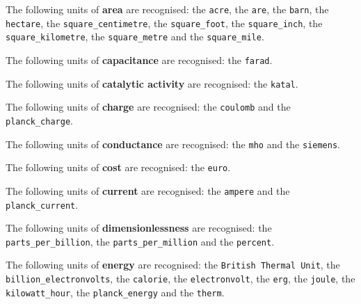\noindent The following units of {\bf area} are recognised:\newline
\noindent the {\tt acre}, the {\tt are}, the {\tt barn}, the {\tt hectare}, the {\tt square\_\-centimetre}, the {\tt square\_\-foot}, the {\tt square\_\-inch}, the {\tt square\_\-kilometre}, the {\tt square\_\-metre} and the {\tt square\_\-mile}.\vspace{5mm}

\noindent The following units of {\bf capacitance} are recognised:\newline
\noindent the {\tt farad}.\vspace{5mm}

\noindent The following units of {\bf catalytic activity} are recognised:\newline
\noindent the {\tt katal}.\vspace{5mm}

\noindent The following units of {\bf charge} are recognised:\newline
\noindent the {\tt coulomb} and the {\tt planck\_\-charge}.\vspace{5mm}

\noindent The following units of {\bf conductance} are recognised:\newline
\noindent the {\tt mho} and the {\tt siemens}.\vspace{5mm}

\noindent The following units of {\bf cost} are recognised:\newline
\noindent the {\tt euro}.\vspace{5mm}

\noindent The following units of {\bf current} are recognised:\newline
\noindent the {\tt ampere} and the {\tt planck\_\-current}.\vspace{5mm}

\noindent The following units of {\bf dimensionlessness} are recognised:\newline
\noindent the {\tt parts\_\-per\_\-billion}, the {\tt parts\_\-per\_\-million} and the {\tt percent}.\vspace{5mm}

\noindent The following units of {\bf energy} are recognised:\newline
\noindent the {\tt British Thermal Unit}, the {\tt billion\_\-electronvolts}, the {\tt calorie}, the {\tt electronvolt}, the {\tt erg}, the {\tt joule}, the {\tt kilowatt\_\-hour}, the {\tt planck\_\-energy} and the {\tt therm}.\vspace{5mm}

